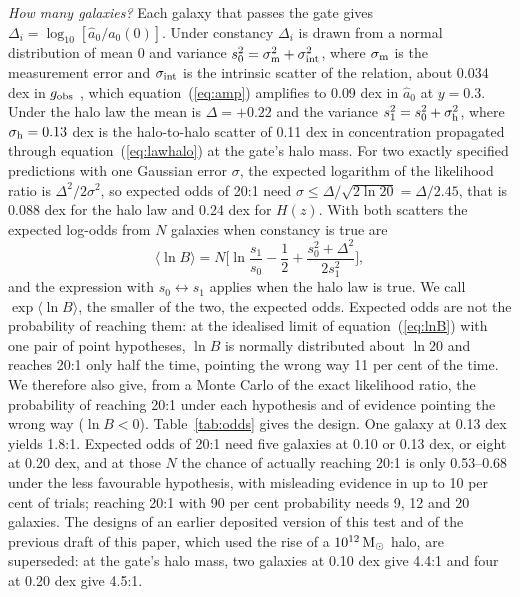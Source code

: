 \documentclass[fleqn,usenatbib]{mnras}
\begin{document}
\emph{How many galaxies?} Each galaxy that passes the gate gives $\Delta_i=\log_{10}[\hat a_0/a_0(0)]$. Under constancy $\Delta_i$ is drawn from a normal distribution of mean 0 and variance $s_0^2=\sigma_{\rm m}^2+\sigma_{\rm int}^2$, where $\sigma_{\rm m}$ is the measurement error and $\sigma_{\rm int}$ is the intrinsic scatter of the relation, about 0.034 dex in $g_{\rm obs}$ \citep{Desmond2023}, which equation~(\ref{eq:amp}) amplifies to 0.09 dex in $\hat a_0$ at $y=0.3$. Under the halo law the mean is $\Delta=+0.22$ and the variance $s_1^2=s_0^2+\sigma_{\rm h}^2$, where $\sigma_{\rm h}=0.13$ dex is the halo-to-halo scatter of 0.11 dex in concentration \citep{DuttonMaccio2014} propagated through equation~(\ref{eq:lawhalo}) at the gate's halo mass. For two exactly specified predictions with one Gaussian error $\sigma$, the expected logarithm of the likelihood ratio is $\Delta^2/2\sigma^2$, so expected odds of 20:1 \citep[strong evidence on the scale of][]{KassRaftery1995} need $\sigma\le\Delta/\sqrt{2\ln20}=\Delta/2.45$, that is 0.088 dex for the halo law and 0.24 dex for $H(z)$. With both scatters the expected log-odds from $N$ galaxies when constancy is true are
\begin{equation}
\langle\ln B\rangle=N\Big[\ln\frac{s_1}{s_0}-\frac12+\frac{s_0^2+\Delta^2}{2s_1^2}\Big],
\label{eq:lnB}
\end{equation}
and the expression with $s_0\leftrightarrow s_1$ applies when the halo law is true. We call $\exp\langle\ln B\rangle$, the smaller of the two, the expected odds. Expected odds are not the probability of reaching them: at the idealised limit of equation~(\ref{eq:lnB}) with one pair of point hypotheses, $\ln B$ is normally distributed about $\ln20$ and reaches 20:1 only half the time, pointing the wrong way 11 per cent of the time. We therefore also give, from a Monte Carlo of the exact likelihood ratio, the probability of reaching 20:1 under each hypothesis and of evidence pointing the wrong way ($\ln B<0$). Table~\ref{tab:odds} gives the design. One galaxy at 0.13 dex yields 1.8:1. Expected odds of 20:1 need five galaxies at 0.10 or 0.13 dex, or eight at 0.20 dex, and at those $N$ the chance of actually reaching 20:1 is only 0.53--0.68 under the less favourable hypothesis, with misleading evidence in up to 10 per cent of trials; reaching 20:1 with 90 per cent probability needs 9, 12 and 20 galaxies. The designs of an earlier deposited version of this test \citep{Zimmerman2026a0z} and of the previous draft of this paper, which used the rise of a $10^{12}\,{\rm M_\odot}$ halo, are superseded: at the gate's halo mass, two galaxies at 0.10 dex give 4.4:1 and four at 0.20 dex give 4.5:1.
\end{document}
